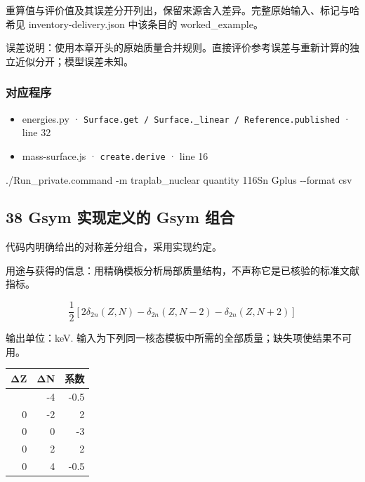 \documentclass[
  11pt,
  letterpaper,
]{article}
\newenvironment{Shaded}{}{}
\newcommand{\AttributeTok}[1]{\textcolor[rgb]{0.49,0.56,0.16}{#1}}
\newcommand{\ExtensionTok}[1]{#1}
\newcommand{\NormalTok}[1]{#1}
\providecommand{\tightlist}{%
  \setlength{\itemsep}{0pt}\setlength{\parskip}{0pt}}
\begin{document}
重算值与评价值及其误差分开列出，保留来源舍入差异。完整原始输入、标记与哈希见
inventory-delivery.json 中该条目的 worked\_example。

误差说明：使用本章开头的原始质量合并规则。直接评价参考误差与重新计算的独立近似分开；模型误差未知。

\subsubsection{对应程序}\label{ux5bf9ux5e94ux7a0bux5e8f-36}

\begin{itemize}
\tightlist
\item
  energies.py ·
  \texttt{Surface.get\ /\ Surface.\_linear\ /\ Reference.published} ·
  line 32
\item
  mass-surface.js · \texttt{create.derive} · line 16
\end{itemize}

\begin{Shaded}
\begin{Highlighting}[]
\ExtensionTok{./Run\_private.command} \AttributeTok{{-}m}\NormalTok{ traplab\_nuclear quantity 116Sn Gplus }\AttributeTok{{-}{-}format}\NormalTok{ csv}
\end{Highlighting}
\end{Shaded}

\subsection{38 Gsym 实现定义的 Gsym
组合}\label{gsym-ux5b9eux73b0ux5b9aux4e49ux7684-gsym-ux7ec4ux5408}

代码内明确给出的对称差分组合，采用实现约定。

用途与获得的信息：用精确模板分析局部质量结构，不声称它是已核验的标准文献指标。

\[
\frac12[2\delta_{2n}(Z,N)-\delta_{2n}(Z,N-2)-\delta_{2n}(Z,N+2)]
\]

输出单位：keV.
输入为下列同一核态模板中所需的全部质量；缺失项使结果不可用。

\begin{longtable}[]{@{}rrr@{}}
\toprule\noalign{}
ΔZ & ΔN & 系数 \\
\midrule\noalign{}
\endhead
\bottomrule\noalign{}
\endlastfoot
0 & -4 & -0.5 \\
0 & -2 & 2 \\
0 & 0 & -3 \\
0 & 2 & 2 \\
0 & 4 & -0.5 \\
\end{longtable}
\end{document}
